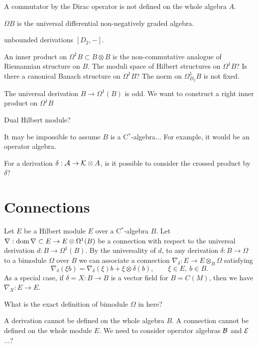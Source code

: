 \documentclass{../../large}
\begin{document}
\begin{prb}

A commutator by the Dirac operator is not defined on the whole algebra $A$.
\end{prb}


$\Omega B$ is the universal differential non-negatively graded algebra.



unbounded derivations $[D_2,-]$.


An inner product on $\Omega^1B\subset B\otimes B$ is the non-commutative analogue of Riemannian structure on $B$.
The moduli space of Hilbert structures on $\Omega^1B$?
Is there a canonical Banach structure on $\Omega^1B$?
The norm on $\Omega^1_{D_2}B$ is not fixed.



The universal derivation $B\to\Omega^1(B)$ is odd.
We want to construct a right inner product on $\Omega^1B$

Dual Hilbert module?


It may be impossible to assume $B$ is a C$^*$-algebra...
For example, it would be an operator algebra.


For a derivation $\delta:\mathcal{A}\to\mathcal{K}\otimes A$, is it possible to consider the crossed product by $\delta$?

\begin{prb}
\end{prb}

\section{Connections}


\begin{prb}
Let $E$ be a Hilbert module $E$ over a C$^*$-algebra $B$.
Let $\nabla:\operatorname{dom}\nabla\subset E\to E\otimes\Omega^1(B)$ be a connection with respect to the universal derivation $d:B\to\Omega^1(B)$.
By the universality of $d$, to any derivation $\delta:B\to\Omega$ to a bimodule $\Omega$ over $B$ we can associate a connection $\nabla_\delta:E\to E\otimes_B\Omega$ satisfying
\[\nabla_\delta(\xi b)=\nabla_\delta(\xi)b+\xi\otimes\delta(b),\qquad \xi\in E,\ b\in B.\]
As a special case, if $\delta=X:B\to B$ is a vector field for $B=C(M)$, then we have $\nabla_X:E\to E$.

What is the exact definition of bimodule $\Omega$ in here?

A derivation cannot be defined on the whole algebra $B$.
A connection cannot be defined on the whole module $E$.
We need to consider operator algebras $\mathcal{B}$ and $\mathcal{E}$...?





\end{prb}
\end{document}
